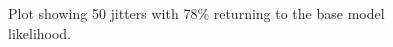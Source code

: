 \documentclass[
]{scrartcl}
\begin{document}
\begin{figure}


\caption{\label{fig-full-jitter}Plot showing 50 jitters with 78\%
returning to the base model likelihood.}

\end{figure}%
\end{document}
